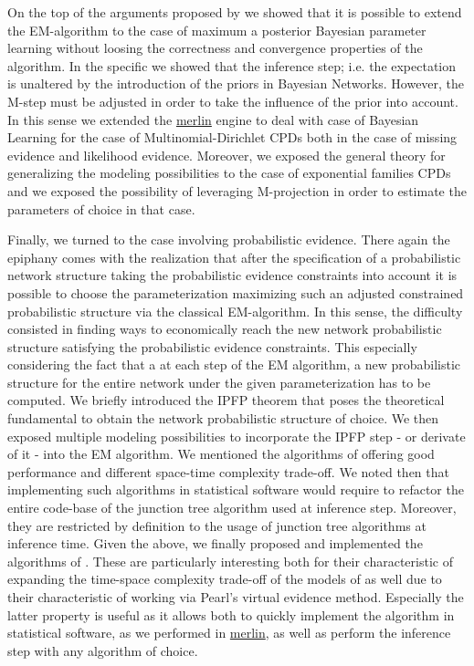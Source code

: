 \documentclass[11pt]{article}
\begin{document}
\begin{article}
On the top of the arguments proposed by \cite{Wasserkrug_all} we
showed that it is possible to extend the EM-algorithm to the case of
maximum a posterior Bayesian parameter learning without loosing the
correctness and convergence properties of the algorithm. In the
specific we showed that the inference step; i.e. the expectation is
unaltered by the introduction of the priors in Bayesian
Networks. However, the M-step must be adjusted in order to take the
influence of the prior into account. In this sense we extended the
\href{https://github.com/radum2275/merlin}{merlin} engine to deal with case of Bayesian Learning for the case of
Multinomial-Dirichlet CPDs both in the case of missing evidence and
likelihood evidence. Moreover, we exposed the general theory for
generalizing the modeling possibilities to the case of exponential
families CPDs and we exposed the possibility of leveraging
M-projection in order to estimate the parameters of choice in that
case.

Finally, we turned to the case involving probabilistic
evidence. There again the epiphany comes with the realization that
after the specification of a probabilistic network structure taking
the probabilistic evidence constraints into account it is possible
to choose the parameterization maximizing such an adjusted
constrained probabilistic structure via the classical EM-algorithm.
In this sense, the difficulty consisted in finding ways to
economically reach the new network probabilistic structure
satisfying the probabilistic evidence constraints. This especially
considering the fact that a at each step of the EM algorithm, a new
probabilistic structure for the entire network under the given
parameterization has to be computed. We briefly introduced the IPFP
theorem that poses the theoretical fundamental to obtain the network
probabilistic structure of choice. We then exposed multiple modeling
possibilities to incorporate the IPFP step - or derivate of it -
into the EM algorithm. We mentioned the algorithms of
\cite{Valtorta_2002} offering good performance and different
space-time complexity trade-off. We noted then that implementing such
algorithms in statistical software would require to refactor the
entire code-base of the junction tree algorithm used at inference
step. Moreover, they are restricted by definition to the usage of
junction tree algorithms at inference time. Given the above, we
finally proposed and implemented the algorithms of
\cite{PENG_2010}. These are particularly interesting both for their
characteristic of expanding the time-space complexity trade-off
of the models of \cite{Valtorta_2002} as well due to their
characteristic of working via Pearl's virtual evidence
method. Especially the latter property is useful as it allows both
to quickly implement the algorithm in statistical software, as we
performed in \href{https://github.com/radum2275/merlin}{merlin}, as well as perform the inference step with any
algorithm of choice.


\end{article}
\end{document}
